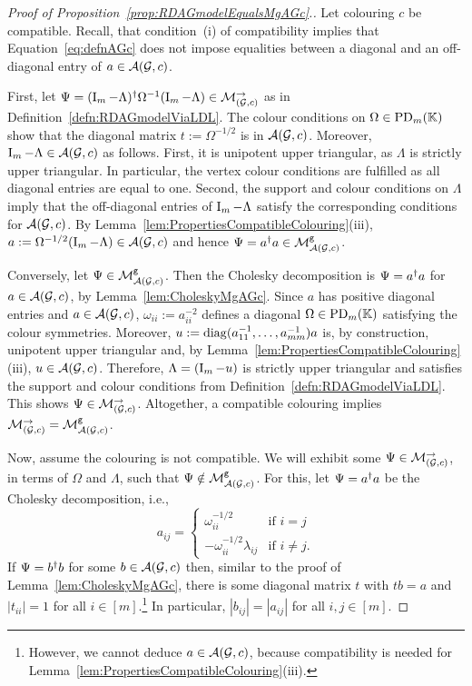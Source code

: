 \begin{proof}[Proof of Proposition~\ref{prop:RDAGmodelEqualsMgAGc}.]	%
	Let colouring $c$ be compatible. Recall, that condition~(i) of compatibility implies that Equation~\eqref{eq:defnAGc} does not impose equalities between a diagonal and an off-diagonal entry of $a \in \mathcal{A}(\mathcal{G}, c)$.
	
	First, let $\Psi = (\operatorname{I}_m - \Lambda)^{\dagger} \Omega^{-1} (\operatorname{I}_m - \Lambda) \in \mathcal{M}_{(\mathcal{G}, c)}^{\to}$ as in Definition~\ref{defn:RDAGmodelViaLDL}. The colour conditions on $\Omega \in \operatorname{PD}_m(\mathbb K)$ show that the diagonal matrix $t := \Omega^{-1/2}$ is in $\mathcal{A}(\mathcal{G}, c)$. Moreover, $\operatorname{I}_m - \Lambda \in \mathcal{A}(\mathcal{G}, c)$ as follows. First, it is unipotent upper triangular, as $\Lambda$ is strictly upper triangular. In particular, the vertex colour conditions are fulfilled as all diagonal entries are equal to one. Second, the support and colour conditions on $\Lambda$ imply that the off-diagonal entries of $\operatorname{I}_m - \Lambda$ satisfy the corresponding conditions for $\mathcal{A}(\mathcal{G}, c)$.
	By Lemma~\ref{lem:PropertiesCompatibleColouring}(iii), $a := \Omega^{-1/2} (\operatorname{I}_m - \Lambda) \in \mathcal{A}(\mathcal{G}, c)$ and hence $\Psi = a^{\dagger} a \in \mathcal{M}^{\mathtt{g}}_{\mathcal{A}(\mathcal{G}, c)}$.
	
	Conversely, let $\Psi \in \mathcal{M}^{\mathtt{g}}_{\mathcal{A}(\mathcal{G}, c)}$. Then the Cholesky decomposition is $\Psi = a^{\dagger} a$ for $a \in \mathcal{A}(\mathcal{G}, c)$, by Lemma~\ref{lem:CholeskyMgAGc}. Since $a$ has positive diagonal entries and $a \in \mathcal{A}(\mathcal{G}, c)$, $\omega_{ii} := a_{ii}^{-2}$ defines a diagonal $\Omega \in \operatorname{PD}_m(\mathbb K)$ satisfying the colour symmetries. Moreover, $u := \operatorname{diag}(a_{11}^{-1}, \ldots, a_{mm}^{-1}) a$ is, by construction, unipotent upper triangular and, by Lemma~\ref{lem:PropertiesCompatibleColouring}(iii), $u \in \mathcal{A}(\mathcal{G}, c)$. Therefore, $\Lambda = (\operatorname{I}_m - u)$ is strictly upper triangular and satisfies the support and colour conditions from Definition~\ref{defn:RDAGmodelViaLDL}. This shows $\Psi \in \mathcal{M}_{(\mathcal{G}, c)}^{\to}$. Altogether, a compatible colouring implies $\mathcal{M}_{(\mathcal{G}, c)}^{\to} = \mathcal{M}^{\mathtt{g}}_{\mathcal{A}(\mathcal{G}, c)}$.
	
	Now, assume the colouring is not compatible. We will exhibit some $\Psi \in \mathcal{M}_{(\mathcal{G}, c)}^{\to}$, in terms of $\Omega$ and $\Lambda$, such that $\Psi \notin \mathcal{M}^{\mathtt{g}}_{\mathcal{A}(\mathcal{G}, c)}$. For this, let $\Psi = a^{\dagger} a$ be the Cholesky decomposition, i.e.,
	\begin{equation}
		\label{eq:entries_a}
		a_{ij} = \begin{cases} \omega_{ii}^{-1/2} & \text{if } i = j \\ 
			-\omega_{ii}^{-1/2} \lambda_{ij} 
			& \text{if } i \neq j .
		\end{cases} 
	\end{equation}
	If $\Psi = b^{\dagger} b$ for some $b \in \mathcal{A}(\mathcal{G}, c)$ then, similar to the proof of Lemma~\ref{lem:CholeskyMgAGc}, there is some diagonal matrix $t$ with $tb = a$ and $|t_{ii}| = 1$ for all $i \in [m]$.\footnote{However, we cannot deduce $a \in \mathcal{A}(\mathcal{G}, c)$, because compatibility is needed for Lemma~\ref{lem:PropertiesCompatibleColouring}(iii).} In particular, $|b_{ij}| = |a_{ij}|$ for all $i,j \in [m]$.
	

\end{proof}
